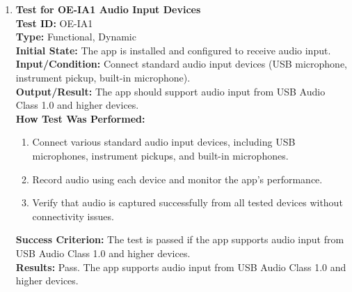 \documentclass[12pt, titlepage]{article}
\begin{document}
\begin{enumerate}
    \item \textbf{Test for OE-IA1 Audio Input Devices} \\
      \newline
      \textbf{Test ID:} OE-IA1 \\
      \textbf{Type:} Functional, Dynamic \\
      \textbf{Initial State:} The app is installed and configured to receive audio input. \\
      \textbf{Input/Condition:} Connect standard audio input devices (USB microphone, instrument pickup, built-in microphone). \\
      \textbf{Output/Result:} The app should support audio input from USB Audio Class 1.0 and higher devices. \\
      \textbf{How Test Was Performed:}
      \begin{enumerate}
          \item Connect various standard audio input devices, including USB microphones, instrument pickups, and built-in microphones.
          \item Record audio using each device and monitor the app’s performance.
          \item Verify that audio is captured successfully from all tested devices without connectivity issues.
      \end{enumerate}
      \textbf{Success Criterion:} The test is passed if the app supports audio input from USB Audio Class 1.0 and higher devices.\\
      \textbf{Results:} Pass. The app supports audio input from USB Audio Class 1.0 and higher devices.\\


\end{enumerate}
\end{document}
